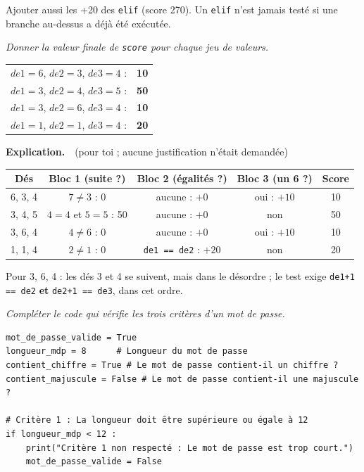 \documentclass[addpoints, 11pt]{exam}
\newcommand{\enonce}[1]{\textit{#1}\par\smallskip}
\newcommand{\explication}{\par\smallskip\noindent\textbf{Explication.}\ }
\newcommand{\code}[1]{\texttt{#1}}
\DeclareRobustCommand{\_}{\textunderscore\allowbreak}
\begin{document}
\begin{questions}
\begin{erreur}
Ajouter aussi les +20 des \code{elif} (score 270). Un \code{elif} n'est jamais testé si une branche au-dessus a déjà été exécutée.
\end{erreur}

\question[2] \enonce{Donner la valeur finale de \code{score} pour chaque jeu de valeurs.}
\begin{reponse}
\begin{tabular}{ll}
$de1 = 6$, $de2 = 3$, $de3 = 4$ : & \textbf{10}\\
$de1 = 3$, $de2 = 4$, $de3 = 5$ : & \textbf{50}\\
$de1 = 3$, $de2 = 6$, $de3 = 4$ : & \textbf{10}\\
$de1 = 1$, $de2 = 1$, $de3 = 4$ : & \textbf{20}\\
\end{tabular}
\end{reponse}
\explication\ (pour toi ; aucune justification n'était demandée)
\begin{center}
\small
\begin{tabular}{|c|c|c|c|c|}
\hline
Dés & Bloc 1 (suite ?) & Bloc 2 (égalités ?) & Bloc 3 (un 6 ?) & Score \\ \hline
6, 3, 4 & $7 \ne 3$ : 0 & aucune : $+0$ & oui : $+10$ & 10 \\
3, 4, 5 & $4 = 4$ et $5 = 5$ : 50 & aucune : $+0$ & non & 50 \\
3, 6, 4 & $4 \ne 6$ : 0 & aucune : $+0$ & oui : $+10$ & 10 \\
1, 1, 4 & $2 \ne 1$ : 0 & \code{de1 == de2} : $+20$ & non & 20 \\ \hline
\end{tabular}
\end{center}
Pour 3, 6, 4 : les dés 3 et 4 se suivent, mais dans le désordre ; le test exige \code{de1+1 == de2} \textbf{et} \code{de2+1 == de3}, dans cet ordre.

\question[1\half] \enonce{Compléter le code qui vérifie les trois critères d'un mot de passe.}
\begin{reponse}
\begin{lstlisting}
mot_de_passe_valide = True
longueur_mdp = 8      # Longueur du mot de passe
contient_chiffre = True # Le mot de passe contient-il un chiffre ?
contient_majuscule = False # Le mot de passe contient-il une majuscule ?

# Critère 1 : La longueur doit être supérieure ou égale à 12
if longueur_mdp < 12 :
    print("Critère 1 non respecté : Le mot de passe est trop court.")
    mot_de_passe_valide = False


\end{lstlisting}
\end{reponse}
\end{questions}
\end{document}
